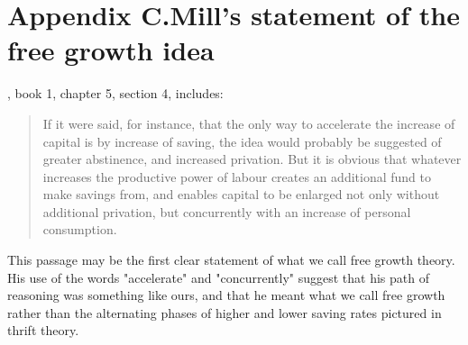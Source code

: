 \documentclass[a4paper,fleqn]{latex_styles/cas-sc}
\begin{document}
\renewcommand{\theequation}{C.\arabic{equation}}
\setcounter{equation}{0}

\hypertarget{appendix-c}{%
\section*{Appendix C.\hspace{0.5em}Mill's statement of the free growth idea}\label{appendix-c}}

\cite{millPrinciplesPoliticalEconomy1848}, book 1, chapter 5, section 4, includes:
\begin{quote}
If it were said, for instance, that the only way to accelerate the increase of capital is by increase of saving, the idea would probably be suggested of greater abstinence, and increased privation. But it is obvious that whatever increases the productive power of labour creates an additional fund to make savings from, and enables capital to be enlarged not only without additional privation, but concurrently with an increase of personal consumption. 
\end{quote}

This passage may be the first clear statement of what we call free growth theory. His use of the words "accelerate" and "concurrently" suggest that his path of reasoning was something like ours, and that he meant what we call free growth rather than the alternating phases of higher and lower saving rates pictured in thrift theory.



\printcredits

% 



\end{document}
